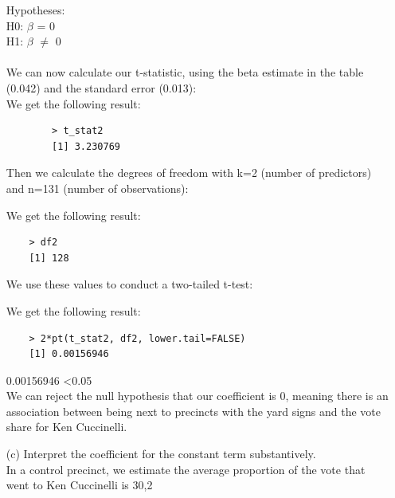 \documentclass[12pt,letterpaper]{article}
\begin{document}
\begin{enumerate}
	
		Hypotheses:\\
	H0: $\beta$ = 0\\
	H1: $\beta$ $\neq$ 0\\
	\vspace{.5cm} \\
	We can now calculate our t-statistic, using the beta estimate in the table (0.042) and the standard error (0.013):\\
	
	 
	
	We get the following result:
	
	\begin{verbatim}
		> t_stat2
		[1] 3.230769
	\end{verbatim}
	
	Then we calculate the degrees of freedom with k=2 (number of predictors) and n=131 (number of observations):
	 
	
	We get the following result:
	
	\begin{verbatim}
	> df2
	[1] 128
	\end{verbatim}
	
	We use these values to conduct a two-tailed t-test:
	 
	
	We get the following result:
	
	\begin{verbatim}
	> 2*pt(t_stat2, df2, lower.tail=FALSE)
	[1] 0.00156946
	\end{verbatim}
	
	0.00156946 \textless 0.05 \\ 
	We can reject the null hypothesis that our coefficient is 0, meaning there is an association between being next to precincts with the yard signs and the vote share for Ken Cuccinelli.
	
	
	\vspace{1cm}
	\item [(c)] Interpret the coefficient for the constant term substantively. \\
	In a control precinct, we estimate the average proportion of the vote that went to Ken Cuccinelli is 30,2%
	\vspace{1cm}
	

\end{enumerate}
\end{document}
